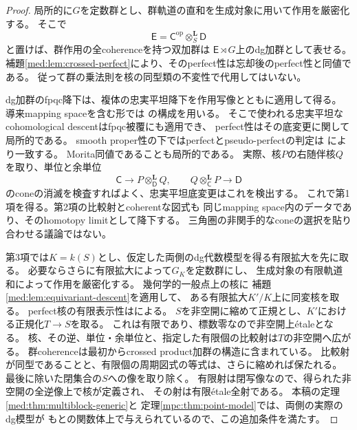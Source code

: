 \begin{proof}
局所的に$G$を定数群とし、群軌道の直和を生成対象に用いて作用を厳密化する。
そこで
\[
 \mathsf E=\mathsf C^{\mathrm{op}}\otimes_S^{\mathbf L}\mathsf D
\]
と置けば、群作用の全coherenceを持つ双加群は
$\mathsf E\rtimes G$上のdg加群として表せる。
補題\ref{med:lem:crossed-perfect}により、そのperfect性は忘却後のperfect性と同値である。
従って群の乗法則を核の同型類の不変性で代用してはいない。

dg加群のfpqc降下は、複体の忠実平坦降下を作用写像とともに適用して得る。
導来mapping spaceを含む形では
\cite[Lemma~3.1とその証明]{ROGTV}の構成を用いる。
そこで使われる忠実平坦なcohomological descentはfpqc被覆にも適用でき、
perfect性はその底変更に関して局所的である。
smooth proper性の下ではperfectとpseudo-perfectの判定は
\cite[Lemma~2.8]{ROGTV}により一致する。
Morita同値であることも局所的である。
実際、核$P$の右随伴核$Q$を取り、単位と余単位
\[
 \mathsf C\longrightarrow P\otimes_{\mathsf D}^{\mathbf L}Q,\qquad
 Q\otimes_{\mathsf C}^{\mathbf L}P\longrightarrow\mathsf D
\]
のconeの消滅を検査すればよく、忠実平坦底変更はこれを検出する。
これで第1項を得る。第2項の比較射とcoherentな図式も
同じmapping space内のデータであり、そのhomotopy limitとして降下する。
三角圏の非関手的なconeの選択を貼り合わせる議論ではない。

第3項では$K=k(S)$とし、仮定した両側のdg代数模型を得る有限拡大を先に取る。
必要ならさらに有限拡大によって$G_K$を定数群にし、
生成対象の有限軌道和によって作用を厳密化する。
幾何学的一般点上の核に
補題\ref{med:lem:equivariant-descent}を適用して、
ある有限拡大$K'/K$上に同変核を取る。
perfect核の有限表示性は\cite[Lemma~2.10]{ROGTV}による。
$S$を非空開に縮めて正規とし、$K'$における正規化$T\to S$を取る。
これは有限であり、標数零なので非空開上\'etaleとなる。
核、その逆、単位・余単位と、指定した有限個の比較射は$T$の非空開へ広がる。
群coherenceは最初からcrossed product加群の構造に含まれている。
比較射が同型であることと、有限個の周期図式の等式は、さらに縮めれば保たれる。
最後に除いた閉集合の$S$への像を取り除く。
有限射は閉写像なので、得られた非空開の全逆像上で核が定義され、
その射は有限\'etale全射である。
本稿の定理\ref{med:thm:multiblock-generic}と
定理\ref{mpc:thm:point-model}では、両側の実際のdg模型が
もとの関数体上で与えられているので、この追加条件を満たす。
\end{proof}

